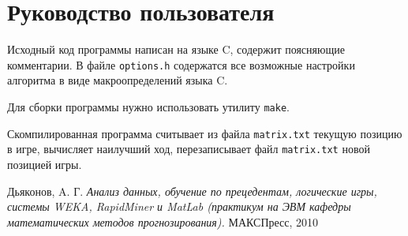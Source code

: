 \documentclass[a4paper]{article}
\begin{document}
\section{Руководство пользователя}

Исходный код программы написан на языке C, содержит поясняющие комментарии. В файле {\tt options.h} содержатся все возможные настройки алгоритма в виде макроопределений языка C.

Для сборки программы нужно использовать утилиту {\tt make}.

Скомпилированная программа считывает из файла {\tt matrix.txt} текущую позицию в игре, вычисляет наилучший ход, перезаписывает файл {\tt matrix.txt} новой позицией игры.


\begin{thebibliography}{1}

	Дьяконов, A. Г. 
	\emph{Анализ данных, обучение по прецедентам, логические игры, системы WEKA, RapidMiner и MatLab (практикум на ЭВМ кафедры математических методов прогнозирования). }
	МАКСПресс, 2010

\end{thebibliography}
\end{document}
